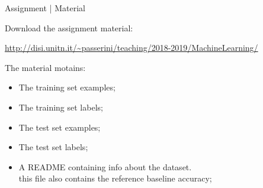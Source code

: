 \documentclass[10pt]{beamer}
\begin{document}
\begin{frame}{Assignment | Material}

Download the assignment material:

{\footnotesize \url{http://disi.unitn.it/~passerini/teaching/2018-2019/MachineLearning/}}

The material motains:
    \begin{itemize}
    \item The training set examples;
    \item The training set labels;
    \item The test set examples;
    \item The test set labels;
    \item A README containing info about the dataset. \\ this file also contains
          the reference baseline accuracy;
    \end{itemize}

\end{frame}


%
%
%
%
%

\end{document}
